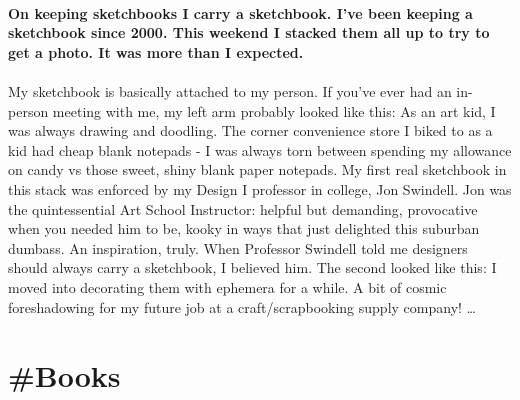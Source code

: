 \documentclass[10pt,a4paper]{article}
\begin{document}
\begin{multicols}{2}
\paragraph{}
\textbf{On keeping sketchbooks
I carry a sketchbook. I’ve been keeping a sketchbook since 2000. This weekend I stacked them all up to try to get a photo. It was more than I expected.}
\paragraph{}

My sketchbook is basically attached to my person. If you’ve ever had an in-person meeting with me, my left arm probably looked like this:
As an art kid, I was always drawing and doodling. The corner convenience store I biked to as a kid had cheap blank notepads - I was always torn between spending my allowance on candy vs those sweet, shiny blank paper notepads.
My first real sketchbook in this stack was enforced by my Design I professor in college, Jon Swindell. Jon was the quintessential Art School Instructor: helpful but demanding, provocative when you needed him to be, kooky in ways that just delighted this suburban dumbass. An inspiration, truly.
When Professor Swindell told me designers should always carry a sketchbook, I believed him.
The second looked like this: I moved into decorating them with ephemera for a while. A bit of cosmic foreshadowing for my future job at a craft/scrapbooking supply company!
\dots\par
\end{multicols}

\newpage
\section{\#Books}
\end{document}
